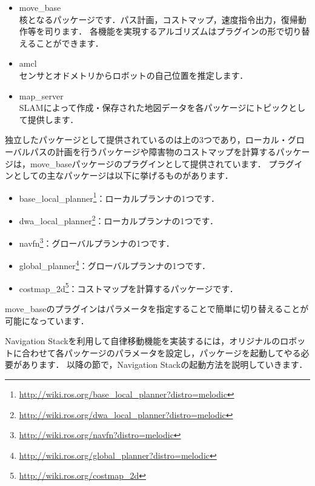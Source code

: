 \documentclass[{../../master}]{subfiles}
\begin{document}
\begin{itemize}
  \item \textsf{move\_base} \\
    核となるパッケージです．パス計画，コストマップ，速度指令出力，復帰動作等を司ります．
    各機能を実現するアルゴリズムはプラグインの形で切り替えることができます．
  \item \textsf{amcl} \\
    センサとオドメトリからロボットの自己位置を推定します．
  \item \textsf{map\_server} \\
    SLAMによって作成・保存された地図データを各パッケージにトピックとして提供します．
\end{itemize}

独立したパッケージとして提供されているのは上の3つであり，ローカル・グローバルパスの計画を行うパッケージや障害物のコストマップを計算するパッケージは，\textsf{move\_base}パッケージのプラグインとして提供されています．
プラグインとしての主なパッケージは以下に挙げるものがあります．

\begin{itemize}
  \item \textsf{base\_local\_planner}\footnote{\url{http://wiki.ros.org/base_local_planner?distro=melodic}}：ローカルプランナの1つです．
  \item \textsf{dwa\_local\_planner}\footnote{\url{http://wiki.ros.org/dwa_local_planner?distro=melodic}}：ローカルプランナの1つです．
  \item \textsf{navfn}\footnote{\url{http://wiki.ros.org/navfn?distro=melodic}}：グローバルプランナの1つです．
  \item \textsf{global\_planner}\footnote{\url{http://wiki.ros.org/global_planner?distro=melodic}}：グローバルプランナの1つです．
  \item \textsf{costmap\_2d}\footnote{\url{http://wiki.ros.org/costmap_2d}}：コストマップを計算するパッケージです．
\end{itemize}

\textsf{move\_base}のプラグインはパラメータを指定することで簡単に切り替えることが可能になっています．

Navigation Stackを利用して自律移動機能を実装するには，オリジナルのロボットに合わせて各パッケージのパラメータを設定し，パッケージを起動してやる必要があります．
以降の節で，Navigation Stackの起動方法を説明していきます．
\end{document}
